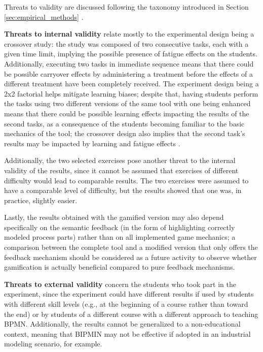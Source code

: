 Threats to validity are discussed following the taxonomy introduced in Section \ref{sec:empirical_methods} \cite{wohlin2012experimentation}.

\textbf{Threats to internal validity} relate mostly to the experimental design being a crossover study: the study was composed of two consecutive tasks, each with a given time limit, implying the possible presence of fatigue effects on the students. Additionally, executing two tasks in immediate sequence means that there could be possible carryover effects by administering a treatment before the effects of a different treatment have been completely received. The experiment design being a 2x2 factorial helps mitigate learning biases; despite that, having students perform the tasks using two different versions of the same tool with one being enhanced means that there could be possible learning effects impacting the results of the second tasks, as a consequence of the students becoming familiar to the basic mechanics of the tool; the crossover design also implies that the second task's results may be impacted by learning and fatigue effects \cite{vegas2016crossover}.

Additionally, the two selected exercises pose another threat to the internal validity of the results, since it cannot be assumed that exercises of different difficulty would lead to comparable results. The two exercises were assumed to have a comparable level of difficulty, but the results showed that one was, in practice, slightly easier.

Lastly, the results obtained with the gamified version may also depend specifically on the semantic feedback (in the form of highlighting correctly modeled process parts) rather than on all implemented game mechanics; a comparison between the complete tool and a modified version that only offers the feedback mechanism should be considered as a future activity to observe whether gamification is actually beneficial compared to pure feedback mechanisms. 

\textbf{Threats to external validity} concern the students who took part in the experiment, since the experiment could have different results if used by students with different skill levels (e.g., at the beginning of a course rather than toward the end) or by students of a different course with a different approach to teaching BPMN. Additionally, the results cannot be generalized to a non-educational context, meaning that BIPMIN may not be effective if adopted in an industrial modeling scenario, for example.

